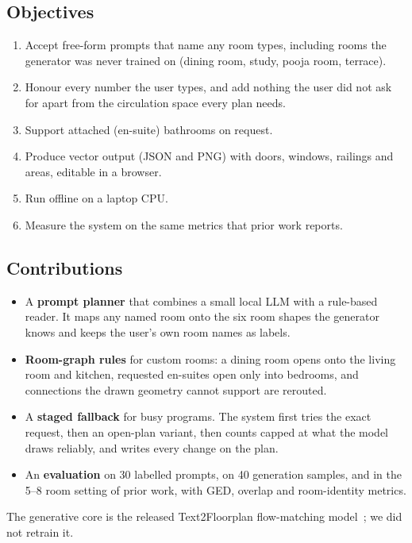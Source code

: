 \documentclass[11pt,a4paper]{article}
\begin{document}
\subsection{Objectives}
\begin{enumerate}
  \item Accept free-form prompts that name any room types, including rooms the
        generator was never trained on (dining room, study, pooja room, terrace).
  \item Honour every number the user types, and add nothing the user did not ask
        for apart from the circulation space every plan needs.
  \item Support attached (en-suite) bathrooms on request.
  \item Produce vector output (JSON and PNG) with doors, windows, railings and
        areas, editable in a browser.
  \item Run offline on a laptop CPU.
  \item Measure the system on the same metrics that prior work reports.
\end{enumerate}

\subsection{Contributions}
\begin{itemize}
  \item A \textbf{prompt planner} that combines a small local LLM with a
        rule-based reader. It maps any named room onto the six room shapes the
        generator knows and keeps the user's own room names as labels.
  \item \textbf{Room-graph rules} for custom rooms: a dining room opens onto the
        living room and kitchen, requested en-suites open only into bedrooms, and
        connections the drawn geometry cannot support are rerouted.
  \item A \textbf{staged fallback} for busy programs. The system first tries the
        exact request, then an open-plan variant, then counts capped at what the
        model draws reliably, and writes every change on the plan.
  \item An \textbf{evaluation} on 30 labelled prompts, on 40 generation samples,
        and in the 5--8 room setting of prior work, with GED, overlap and
        room-identity metrics.
\end{itemize}
The generative core is the released Text2Floorplan flow-matching model~\cite{t2f};
we did not retrain it.
\end{document}
